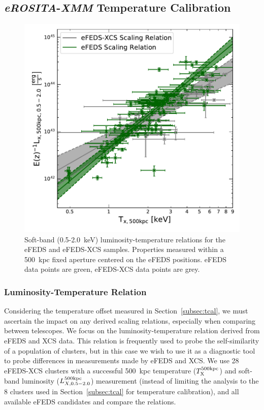 \documentclass[fleqn,usenatbib]{mnras}
\begin{document}
\subsection{{\em eROSITA}-{\em XMM} Temperature Calibration}
\begin{figure}
    \centering
    \includegraphics[width=1\columnwidth]{images/efeds_xcs_wdata_lt.pdf}
    \caption[]{Soft-band (0.5-2.0~keV) luminosity-temperature relations for the eFEDS and eFEDS-XCS samples. Properties measured within a 500~kpc fixed aperture centered on the eFEDS positions. eFEDS data points are green, eFEDS-XCS data points are grey.}
    \label{fig:efedsandxcslt}
\end{figure}


\subsubsection{Luminosity-Temperature Relation}
\label{subsubsec:LT}
Considering the temperature offset measured in Section~\ref{subsec:tcal}, we must ascertain the impact on any  derived scaling relations, especially when comparing between telescopes.  We focus on the luminosity-temperature relation derived from eFEDS and XCS data.  This relation is frequently used to probe the self-similarity of a population of clusters, but in this case we wish to use it as a diagnostic tool to probe differences in measurements made by eFEDS and XCS.  We use 28 eFEDS-XCS clusters with a successful 500~kpc temperature ($T^{\rm 500kpc}_{\rm X}$) and soft-band luminosity ($L^{\rm 500kpc}_{X,0.5-2.0}$) measurement (instead of limiting the analysis to the 8 clusters used in Section~\ref{subsec:tcal} for temperature calibration), and all available eFEDS candidates and compare the relations.  
\end{document}
